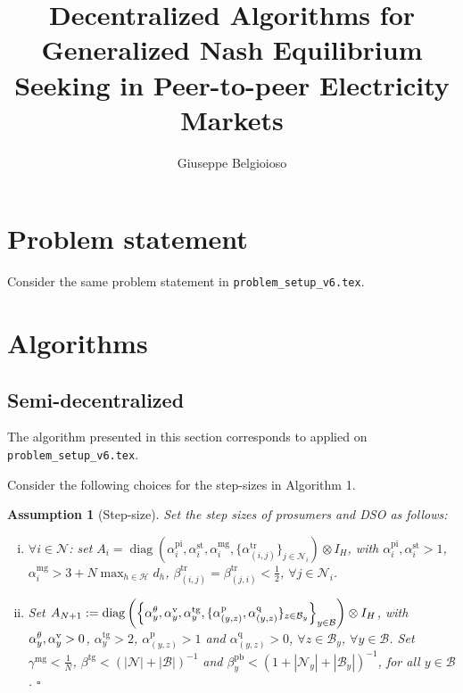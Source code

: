 \documentclass[10pt]{article}
\title{Decentralized Algorithms for Generalized Nash Equilibrium Seeking in Peer-to-peer Electricity Markets}
\author{Giuseppe Belgioioso}
\newtheorem{assumption}{Assumption}{\it}{}
\newcommand{\mc}{\mathcal}
\newcommand{\diag}{\operatorname{diag}}
\newcommand{\0}{\mathbf{0}}
\newcommand{\1}{\mathbf{1}}
\begin{document}
\maketitle

\section{Problem statement}
Consider the same problem statement in \texttt{problem\_setup\_v6.tex}.


\section{Algorithms}
\subsection{Semi-decentralized}

The algorithm presented in this section corresponds to \cite[Alg. 6B]{belgioioso2020semi} applied on  \texttt{problem\_setup\_v6.tex}.

Consider the following choices for the step-sizes in Algorithm 1.
\smallskip

\begin{assumption}[Step-size]\label{ass:SSS}
Set the step sizes of prosumers and DSO as follows:
\begin{enumerate}[(i)]
\item $\forall i \in \mc N$: set $A_i = \diag( \alpha_{i}^{\text{pi}}, \alpha_{i}^{\text{st}} , \alpha_{i}^{\text{mg}} , \{ \alpha_{(i,j)}^{\text{tr}} \}_{j \in \mc N_i} ) \otimes I_H$, with $\alpha_{i}^{\text{pi}}, \alpha_{i}^{\text{st}} > 1$, $ \alpha_{i}^{\text{mg}} > 3 + N \max_{h\in \mc H} d_h $, $\beta^{\text{tr}}_{(i,j)} = \beta^{\text{tr}}_{ (j,i)} < \frac{1}{2}$, $\forall j \in \mc N_i$. 

\item Set $A_{N+1}:=\diag\left(
\left\{
\alpha_y^{\theta},\alpha^{\text v}_y, \alpha_y^{\text{tg}},
\{ 
\alpha^\text{p}_{(y,z)}, \alpha^{\text{q}}_{(y,z)} 
\}_{z \in \mc B_y}
\right\}_{y \in \mc B}
\right) \otimes I_H
$, with $\alpha_y^{\theta},\alpha^{\text v}_y > 0$, $\alpha_y^{\text{tg}} > 2$, $\alpha^{\text{p}}_{(y,z)} > 1$ and $ \alpha^{\text{q}}_{(y,z)} > 0 $, $\forall z \in \mc B_y$, $ \forall y \in \mc B$.
Set $\gamma^{\text{mg}} < \frac{1}{N}$, $\beta^{\text{tg}} < (|\mc N| + |\mc B|)^{-1}$ and $\beta_y^{\text{pb}} < (1+|\mc N_y|+|\mc B_y|)^{-1}$, for all $y \in \mc B$.
{\hfill $\square$}
\end{enumerate}


\end{assumption}
\end{document}
